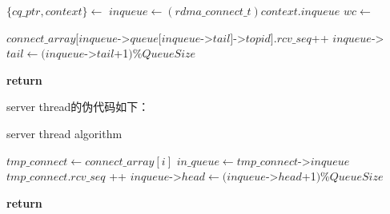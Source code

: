 {\begin{algorithm}
\begin{algorithmic}[1]
            \State $\{ cq\_ptr, context\} \gets$ 
            \State $inqueue \gets (rdma\_connect\_t)context.inqueue$
            \State {}
            \State $wc \gets$ 

            \State
            \State {}
            \Else
            \State {}
            \State {}

            \State
            \State $connect\_array[inqueue$->$queue[inqueue$->$tail]$->$topid].rcv\_seq $++
            \State $inqueue$->$tail \gets (inqueue$->$tail$+1$) \% QueueSize$
            \EndIf
            \EndWhile

            \State
            \State {}
            \State \textbf{return}
            \EndFunction
        \end{algorithmic}
    \end{algorithm}

    \newpage
    server thread的伪代码如下：
    \begin{algorithm}
        \caption{server thread algorithm}
        \begin{algorithmic}[1] %
            \State {}

            \State $tmp\_connect \gets connect\_array[i]$
            \State $in\_queue \gets tmp\_connect$->$inqueue$
            \State {}
            \State {}
            \State {}
            \State $tmp\_connect.rcv\_seq$ ++
            \EndIf
            \State $inqueue$->$head \gets (inqueue$->$head$+1$) \% QueueSize$
            \EndIf
            \EndFor

            \State {}
            \EndIf
            \EndWhile
            \State \textbf{return}
            \EndProcedure
        \end{algorithmic}
    \end{algorithm}

}
